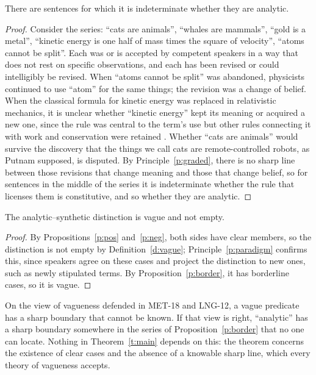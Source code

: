 \documentclass{situationist-preprint}
\begin{document}
\begin{proposition}\label{p:border}
There are sentences for which it is indeterminate whether they are analytic.
\end{proposition}

\begin{proof}
Consider the series: \enquote{cats are animals}, \enquote{whales are mammals}, \enquote{gold is a metal}, \enquote{kinetic energy is one half of mass times the square of velocity}, \enquote{atoms cannot be split}. Each was or is accepted by competent speakers in a way that does not rest on specific observations, and each has been revised or could intelligibly be revised. When \enquote{atoms cannot be split} was abandoned, physicists continued to use \enquote{atom} for the same things; the revision was a change of belief. When the classical formula for kinetic energy was replaced in relativistic mechanics, it is unclear whether \enquote{kinetic energy} kept its meaning or acquired a new one, since the rule was central to the term's use but other rules connecting it with work and conservation were retained \citep{Putnam1962}. Whether \enquote{cats are animals} would survive the discovery that the things we call cats are remote-controlled robots, as Putnam supposed, is disputed. By Principle~\ref{p:graded}, there is no sharp line between those revisions that change meaning and those that change belief, so for sentences in the middle of the series it is indeterminate whether the rule that licenses them is constitutive, and so whether they are analytic.
\end{proof}

\begin{theorem}\label{t:main}
The analytic--synthetic distinction is vague and not empty.
\end{theorem}

\begin{proof}
By Propositions~\ref{p:pos} and~\ref{p:neg}, both sides have clear members, so the distinction is not empty by Definition~\ref{d:vague}; Principle~\ref{p:paradigm} confirms this, since speakers agree on these cases and project the distinction to new ones, such as newly stipulated terms. By Proposition~\ref{p:border}, it has borderline cases, so it is vague.
\end{proof}

On the view of vagueness defended in MET-18 and LNG-12, a vague predicate has a sharp boundary that cannot be known. If that view is right, \enquote{analytic} has a sharp boundary somewhere in the series of Proposition~\ref{p:border} that no one can locate. Nothing in Theorem~\ref{t:main} depends on this: the theorem concerns the existence of clear cases and the absence of a knowable sharp line, which every theory of vagueness accepts.
\end{document}
